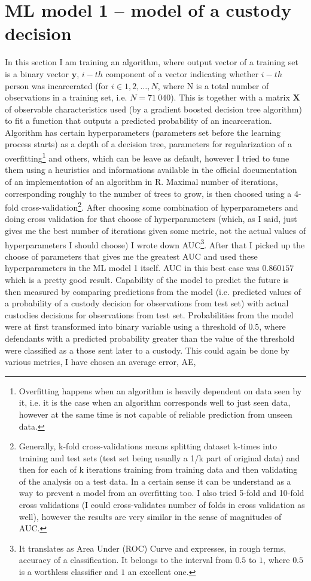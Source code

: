 \documentclass[12pt, twoside,openany]{book} %
\begin{document}
\section{ML model 1 – model of a custody decision}   %
In this section I am training an algorithm, where output vector of a training set is a binary vector $\mathbf{y}$, $i-th$ component of a vector indicating whether $i-th$ person was incarcerated (for $i \in 1, 2, \ldots, N$, where N is a total number of observations in a training set, i.e. $N=71~040$). This is together with a matrix $\mathbf{X}$ of observable characteristics used (by a gradient boosted decision tree algorithm) to fit a function that outputs a predicted probability of an incarceration. Algorithm has certain hyperparameters (parameters set before the learning process starts) as a depth of a decision tree, parameters for regularization of a overfitting\footnote{Overfitting happens when an algorithm is heavily dependent on data seen by it, i.e. it is the case when an algorithm corresponds well to just seen data, however at the same time is not capable of reliable prediction from unseen data.} and others, which can be leave as default, however I tried to tune them using a heuristics and informations available in the official documentation of an implementation of an algorithm in R. Maximal number of iterations, corresponding roughly to the number of trees to grow, is then choosed using a 4-fold cross-validation\footnote{Generally, k-fold cross-validations means splitting dataset k-times into training and test sets (test set being usually a 1/k part of original data) and then for each of k iterations training from training data and then validating of the analysis on a test data. In a certain sense it can be understand as a way to prevent a model from an overfitting too. I also tried 5-fold and 10-fold cross validations (I could cross-validates number of folds in cross validation as well), however the results are very similar in the sense of magnitudes of AUC.}. After choosing some combination of hyperparameters and doing cross validation for that choose of hyperparameters (which, as I said, just gives me the best number of iterations given some metric, not the actual values of hyperparameters I should choose) I wrote down AUC\footnote{It translates as Area Under (ROC) Curve and expresses, in rough terms, accuracy of a classification. It belongs to the interval from $0.5$ to $1$, where $0.5$ is a worthless classifier and $1$ an excellent one.}. After that I picked up the choose of parameters that gives me the greatest AUC and used these hyperparameters in the ML model 1 itself. AUC in this best case was $0.860157$ which is a pretty good result. Capability of the model to predict the future is then measured by comparing predictions from the model (i.e. predicted values of a probability of a custody decision for observations from test set) with actual custodies decisions for observations from test set. Probabilities from the model were at first transformed into binary variable using a threshold of $0.5$, where defendants with a predicted probability greater than the value of the threshold were classified as a those sent later to a custody. This could again be done by various metrics, I have chosen an average error, AE, 
\end{document}
